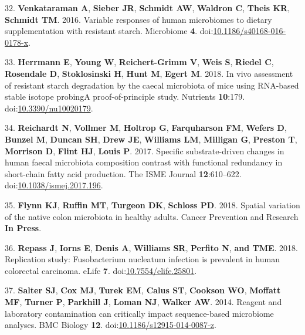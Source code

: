 \documentclass[12pt,]{article}
\begin{document}
\hypertarget{ref-Venkataraman2016}{}
32. \textbf{Venkataraman A}, \textbf{Sieber JR}, \textbf{Schmidt AW},
\textbf{Waldron C}, \textbf{Theis KR}, \textbf{Schmidt TM}. 2016.
Variable responses of human microbiomes to dietary supplementation with
resistant starch. Microbiome \textbf{4}.
doi:\href{https://doi.org/10.1186/s40168-016-0178-x}{10.1186/s40168-016-0178-x}.

\hypertarget{ref-Herrmann2018}{}
33. \textbf{Herrmann E}, \textbf{Young W}, \textbf{Reichert-Grimm V},
\textbf{Weis S}, \textbf{Riedel C}, \textbf{Rosendale D},
\textbf{Stoklosinski H}, \textbf{Hunt M}, \textbf{Egert M}. 2018. In
vivo assessment of resistant starch degradation by the caecal microbiota
of mice using RNA-based stable isotope probingA proof-of-principle
study. Nutrients \textbf{10}:179.
doi:\href{https://doi.org/10.3390/nu10020179}{10.3390/nu10020179}.

\hypertarget{ref-Reichardt2017}{}
34. \textbf{Reichardt N}, \textbf{Vollmer M}, \textbf{Holtrop G},
\textbf{Farquharson FM}, \textbf{Wefers D}, \textbf{Bunzel M},
\textbf{Duncan SH}, \textbf{Drew JE}, \textbf{Williams LM},
\textbf{Milligan G}, \textbf{Preston T}, \textbf{Morrison D},
\textbf{Flint HJ}, \textbf{Louis P}. 2017. Specific substrate-driven
changes in human faecal microbiota composition contrast with functional
redundancy in short-chain fatty acid production. The ISME Journal
\textbf{12}:610--622.
doi:\href{https://doi.org/10.1038/ismej.2017.196}{10.1038/ismej.2017.196}.

\hypertarget{ref-Flynn_2018}{}
35. \textbf{Flynn KJ}, \textbf{Ruffin MT}, \textbf{Turgeon DK},
\textbf{Schloss PD}. 2018. Spatial variation of the native colon
microbiota in healthy adults. Cancer Prevention and Research \textbf{In
Press}.

\hypertarget{ref-Repass2018}{}
36. \textbf{Repass J}, \textbf{Iorns E}, \textbf{Denis A},
\textbf{Williams SR}, \textbf{Perfito N}, \textbf{and TME}. 2018.
Replication study: Fusobacterium nucleatum infection is prevalent in
human colorectal carcinoma. eLife \textbf{7}.
doi:\href{https://doi.org/10.7554/elife.25801}{10.7554/elife.25801}.

\hypertarget{ref-Salter_contamination_2014}{}
37. \textbf{Salter SJ}, \textbf{Cox MJ}, \textbf{Turek EM},
\textbf{Calus ST}, \textbf{Cookson WO}, \textbf{Moffatt MF},
\textbf{Turner P}, \textbf{Parkhill J}, \textbf{Loman NJ},
\textbf{Walker AW}. 2014. Reagent and laboratory contamination can
critically impact sequence-based microbiome analyses. BMC Biology
\textbf{12}.
doi:\href{https://doi.org/10.1186/s12915-014-0087-z}{10.1186/s12915-014-0087-z}.
\end{document}
